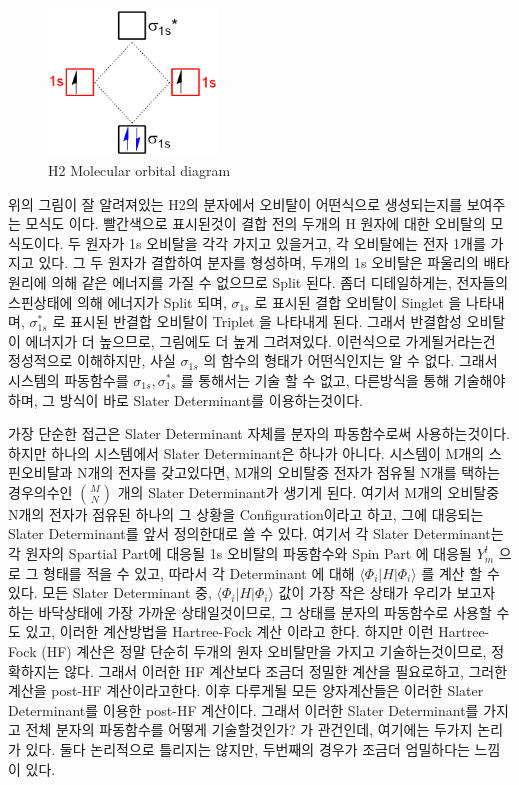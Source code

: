 \documentclass[10pt]{article}
\begin{document}
\begin{figure}[htbp]
  \centering
  \includegraphics[width=0.4\textwidth]{fig/Moecular-Orbital-DiagramH2.png}
  \caption{H2 Molecular orbital diagram}
  \label{fig:example2}
\end{figure}

위의 그림이 잘 알려져있는 H2의 분자에서 오비탈이 어떤식으로 생성되는지를 보여주는 모식도 이다. 
빨간색으로 표시된것이 결합 전의 두개의 H 원자에 대한 오비탈의 모식도이다. 두 원자가 1s 오비탈을 각각 가지고 있을거고, 각 오비탈에는 전자 1개를 가지고 있다. 
그 두 원자가 결합하여 분자를 형성하며, 두개의 1s 오비탈은 파울리의 배타원리에 의해 같은 에너지를 가질 수 없으므로 Split 된다. 좀더 디테일하게는, 전자들의 스핀상태에 의해 에너지가 Split 되며, 
\(\sigma_{1s}\) 로 표시된 결합 오비탈이 Singlet 을 나타내며, \(\sigma_{1s}^*\) 로 표시된 반결합 오비탈이 Triplet 을 나타내게 된다. 그래서 반결합성 오비탈이 에너지가 더 높으므로, 그림에도 더 높게 그려져있다. 
이런식으로 가게될거라는건 정성적으로 이해하지만, 사실 \(\sigma_{1s}\) 의 함수의 형태가 어떤식인지는 알 수 없다. 
그래서 시스템의 파동함수를 \(\sigma_{1s},\sigma_{1s}^*\) 를 통해서는 기술 할 수 없고, 다른방식을 통해 기술해야하며, 그 방식이 바로 Slater Determinant를 이용하는것이다. 

가장 단순한 접근은 Slater Determinant 자체를 분자의 파동함수로써 사용하는것이다. 
하지만 하나의 시스템에서 Slater Determinant은 하나가 아니다. 
시스템이 M개의 스핀오비탈과 N개의 전자를 갖고있다면,  M개의 오비탈중 전자가 점유될 N개를 택하는 경우의수인 \(\binom{M}{N}\) 개의 Slater Determinant가 생기게 된다. 
여기서 M개의 오비탈중 N개의 전자가 점유된 하나의 그 상황을 Configuration이라고 하고, 그에 대응되는 Slater Determinant를 앞서 정의한대로 쓸 수 있다. 
여기서 각 Slater Determinant는 각 원자의 Spartial Part에 대응될 1s 오비탈의 파동함수와 Spin Part 에 대응될 \(Y^l_m\) 으로 그 형태를 적을 수 있고, 따라서 각 Determinant 에 대해 \(\langle \Phi_i|H|\Phi_i \rangle\) 를 계산 할 수 있다. 
모든 Slater Determinant 중, \(\langle \Phi_i|H|\Phi_i \rangle\) 값이 가장 작은 상태가 우리가 보고자 하는 바닥상태에 가장 가까운 상태일것이므로, 그 상태를 분자의 파동함수로 사용할 수도 있고, 
이러한 계산방법을 Hartree-Fock 계산 이라고 한다. 
하지만 이런 Hartree-Fock (HF) 계산은 정말 단순히 두개의 원자 오비탈만을 가지고 기술하는것이므로, 정확하지는 않다. 그래서 이러한 HF 계산보다 조금더 정밀한 계산을 필요로하고, 그러한 계산을 post-HF 계산이라고한다. 
이후 다루게될 모든 양자계산들은 이러한 Slater Determinant를 이용한 post-HF 계산이다. 
그래서 이러한 Slater Determinant를 가지고 전체 분자의 파동함수를 어떻게 기술할것인가? 가 관건인데, 여기에는 두가지 논리가 있다. 둘다 논리적으로 틀리지는 않지만, 두번째의 경우가 조금더 엄밀하다는 느낌이 있다. 
\end{document}
